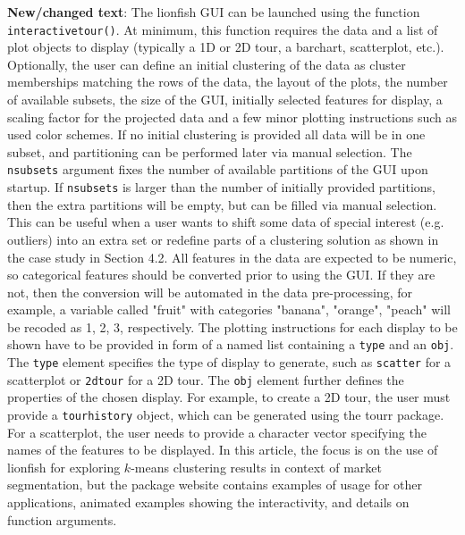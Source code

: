 \documentclass[12pt]{article}
\begin{document}
\begin{itemize}
     \textbf{New/changed text}: The lionfish GUI can be launched using the function \texttt{interactive\textunderscore tour()}. At minimum, this function requires the data and a list of plot objects to display (typically a 1D or 2D tour, a barchart, scatterplot, etc.). Optionally, the user can define an initial clustering of the data as cluster memberships matching the rows of the data, the layout of the plots, the number of available subsets, the size of the GUI, initially selected features for display, a scaling factor for the projected data and a few minor plotting instructions such as used color schemes. If no initial clustering is provided all data will be in one subset, and partitioning can be performed later via manual selection. The \texttt{n\textunderscore subsets} argument fixes the number of available partitions of the GUI upon startup. If \texttt{n\textunderscore subsets} is larger than the number of initially provided partitions, then the extra partitions will be empty, but can be filled via manual selection. This can be useful when a user wants to shift some data of special interest (e.g. outliers) into an extra set or redefine parts of a clustering solution as shown in the case study in Section 4.2. All features in the data are expected to be numeric, so categorical features should be converted prior to using the GUI. If they are not, then the conversion will be automated in the data pre-processing, for example, a variable called "fruit" with categories "banana", "orange",  "peach" will be recoded as 1, 2, 3, respectively. The plotting instructions for each display to be shown have to be provided in form of a named list containing a \texttt{type} and an \texttt{obj}. The \texttt{type} element specifies the type of display to generate, such as \texttt{scatter} for a scatterplot or \texttt{2d\textunderscore tour} for a 2D tour. The \texttt{obj} element further defines the properties of the chosen display.  For example, to create a 2D tour, the user must provide a \texttt{tour\textunderscore history} object, which can be generated using the tourr package. For a scatterplot, the user needs to provide a character vector specifying the names of the features to be displayed. In this article, the focus is on the use of lionfish for exploring $k$-means clustering results in context of market segmentation, but the package website contains examples of usage for other applications, animated examples showing the interactivity, and details on function arguments.


\end{itemize}
\end{document}
